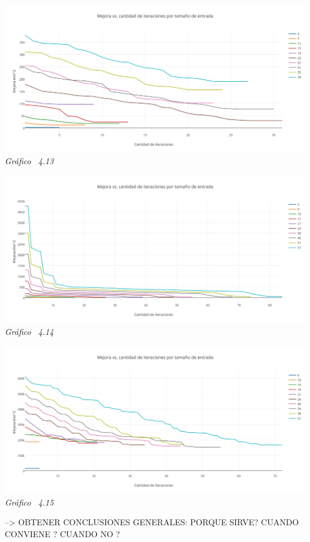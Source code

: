 \vspace*{0.3cm} \vspace*{0.3cm}
  \begin{center}
 \includegraphics[scale=0.5]{./EJ4/mejora.png}\\
 {            \textit{Gráfico \ 4.13}}
  \end{center}
  \vspace*{0.3cm}
  
  \vspace*{0.3cm} \vspace*{0.3cm}
  \begin{center}
 \includegraphics[scale=0.5]{./EJ4/mejora1.png}\\
 {            \textit{Gráfico \ 4.14}}
  \end{center}
  \vspace*{0.3cm}
  
  \vspace*{0.3cm} \vspace*{0.3cm}
  \begin{center}
 \includegraphics[scale=0.5]{./EJ4/mejora2.png}\\
 {            \textit{Gráfico \ 4.15}}
  \end{center}
  \vspace*{0.3cm}
  
--> OBTENER CONCLUSIONES GENERALES: PORQUE SIRVE? CUANDO CONVIENE ? CUANDO NO ? 
  
